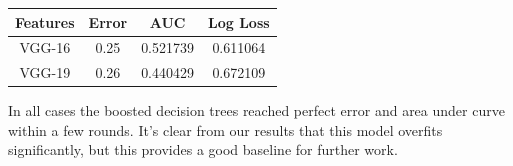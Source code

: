 \documentclass[twocolumn,10pt]{article}
\begin{document}
\begin{center}
\begin{tabular}{ | c c c c | }
\hline
Features & Error & AUC & Log Loss \\ [0.5ex]
\hline\hline
VGG-16 & 0.25 & 0.521739 & 0.611064 \\
\hline
VGG-19 & 0.26 & 0.440429 & 0.672109\\
\hline
\end{tabular}
\end{center}

In all cases the boosted decision trees reached perfect error and area under curve within a few rounds. It's clear from our results that this model overfits significantly, but this provides a good baseline for further work.


\end{document}
